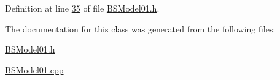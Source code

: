 Definition at line \hyperlink{BSModel01_8h_source_l00035}{35} of file \hyperlink{BSModel01_8h_source}{B\+S\+Model01.\+h}.



The documentation for this class was generated from the following files\+:\begin{DoxyCompactItemize}
\item 
\hyperlink{BSModel01_8h}{B\+S\+Model01.\+h}\item 
\hyperlink{BSModel01_8cpp}{B\+S\+Model01.\+cpp}\end{DoxyCompactItemize}
